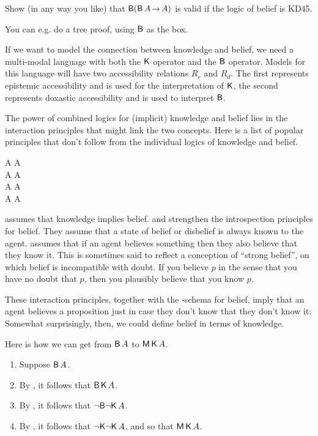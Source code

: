 \begin{exercise}\label{ex:KD45U}
  Show (in any way you like) that $\Bel(\Bel A \to A)$ is valid if the logic of
  belief is KD45.
\end{exercise}
\begin{solution}
  You can e.g. do a tree proof, using $\operatorname{\mathsf{B}}$ as the box.
\end{solution}

If we want to model the connection between knowledge and belief, we need a
multi-modal language with both the $\operatorname{\mathsf{K}{}}$ operator and the $\operatorname{\mathsf{B}}$ operator.
Models for this language will have two accessibility relations $R_{e}$ and
$R_{d}$. The first represents epistemic accessibility and is used for the
interpretation of $\operatorname{\mathsf{K}{}}$, the second represents doxastic accessibility and is
used to interpret $\operatorname{\mathsf{B}}$.

The power of combined logics for (implicit) knowledge and belief lies in the
interaction principles that might link the two concepts. Here is a list of
popular principles that don't follow from the individual logics of knowledge and
belief.
\begin{principles}
   \Kn A \to \Bel A\\
   \Bel A \to \Kn\Bel A\\
   \neg \Bel A \to \Kn\neg \Bel A\\
   \Bel A \to \Bel \Kn A
\end{principles}

 assumes that knowledge implies belief.  and  strengthen
the introspection principles for belief. They assume that a state of belief or
disbelief is always known to the agent.  assumes that if an agent
believes something then they also believe that they know it. This is sometimes
said to reflect a conception of ``strong belief'', on which belief is
incompatible with doubt. If you believe $p$ in the sense that you have no doubt
that $p$, then you plausibly believe that you know $p$.

These interaction principles, together with the -schema for belief, imply
that an agent believes a proposition just in case they don't know that they
don't know it:
%
%
Somewhat surprisingly, then, we could define belief in terms of knowledge.

Here is how we can get from $\operatorname{\mathsf{B}} A$ to $\operatorname{\mathsf{M}}\operatorname{\mathsf{K}{}} A$.
%
\begin{enumerate}[leftmargin=10mm]
  \itemsep-1mm
\item Suppose $\operatorname{\mathsf{B}} A$.
\item By , it follows that $\operatorname{\mathsf{B}} \operatorname{\mathsf{K}{}} A$.
\item By , it follows that $\neg\! \operatorname{\mathsf{B}}\! \neg\! \operatorname{\mathsf{K}{}} A$.
\item By , it follows that $\neg\! \operatorname{\mathsf{K}{}} \!\neg\! \operatorname{\mathsf{K}{}} A$, and so that $\operatorname{\mathsf{M}}\operatorname{\mathsf{K}{}} A$.
\end{enumerate}

